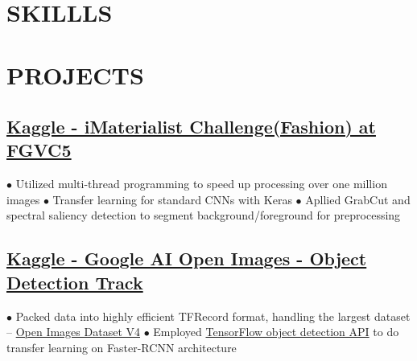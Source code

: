 \documentclass[11pt,a4paper]{moderncv}
\title{  }
\begin{document}
\maketitle
\vspace*{-11mm}

\section{SKILLLS}
\vspace{-0.75\baselineskip}

\section{PROJECTS}
\subsection{\href{https://www.kaggle.com/c/imaterialist-challenge-fashion-2018}{\small Kaggle - iMaterialist Challenge(Fashion) at FGVC5}}
{\footnotesize{$\bullet$ Utilized multi-thread programming to speed up processing over one million images
\newline $\bullet$ Transfer learning for standard CNNs with Keras
\newline $\bullet$ Apllied GrabCut and spectral saliency detection to segment background/foreground for preprocessing}}

\subsection{\href{https://www.kaggle.com/c/google-ai-open-images-object-detection-track}{\small Kaggle - Google AI Open Images - Object Detection Track}}
{\footnotesize{$\bullet$ Packed data into highly efficient TFRecord format, handling the largest dataset -- \href{https://storage.googleapis.com/openimages/web/index.html}{Open Images Dataset V4}  
\newline $\bullet$ Employed \href{https://github.com/tensorflow/models/tree/master/research/object_detection}{TensorFlow object detection API} to do transfer learning on Faster-RCNN architecture}}
\end{document}
